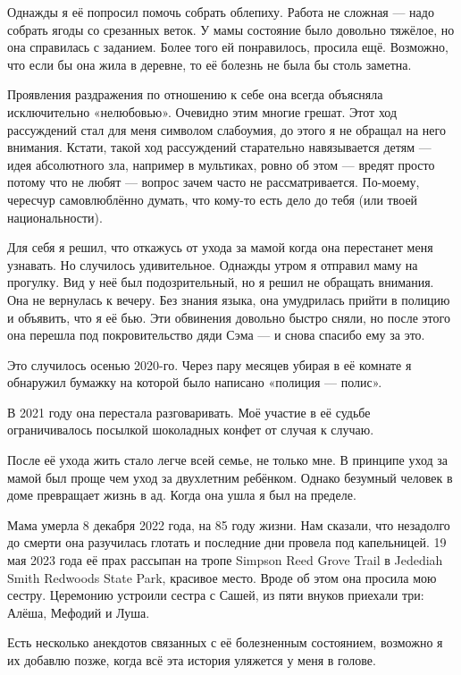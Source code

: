 Однажды я её попросил помочь собрать облепиху.
Работа не сложная --- надо собрать ягоды со срезанных веток.
У мамы состояние было довольно тяжёлое, но она справилась с заданием. 
Более того ей понравилось, просила ещё.
Возможно, что если бы она жила в деревне, то её болезнь не была бы столь заметна.

Проявления раздражения по отношению к себе она всегда объясняла исключительно «нелюбовью».
Очевидно этим многие грешат.
Этот ход рассуждений стал для меня символом слабоумия, до этого я не обращал на него внимания.
Кстати, такой ход рассуждений старательно навязывается детям --- идея абсолютного зла, например в мультиках, ровно об этом --- вредят просто потому что не любят --- вопрос зачем часто не рассматривается.
По-моему, чересчур самовлюблённо думать, что кому-то есть дело до тебя (или твоей национальности). 

Для себя я решил, что откажусь от ухода за мамой когда она перестанет меня узнавать.
Но случилось удивительное.
Однажды утром я отправил маму на прогулку.
Вид у неё был подозрительный, но я решил не обращать внимания.
Она не вернулась к вечеру.
Без знания языка, она умудрилась прийти в полицию и объявить, что я её бью.
Эти обвинения довольно быстро сняли, но после этого она перешла под покровительство дяди Сэма --- и снова спасибо ему за это.

Это случилось осенью 2020-го.
Через пару месяцев убирая в её комнате я обнаружил бумажку на которой было написано «полиция --- полис».

В 2021 году она перестала разговаривать.
Моё участие в её судьбе ограничивалось посылкой шоколадных конфет от случая к случаю.

После её ухода жить стало легче всей семье, не только мне.
В принципе уход за мамой был проще чем уход за двухлетним ребёнком.
Однако безумный человек в доме превращает жизнь в ад.
Когда она ушла я был на пределе.

Мама умерла 8 декабря 2022 года, на 85 году жизни.
Нам сказали, что незадолго до смерти она разучилась глотать и последние дни провела под капельницей.
19 мая 2023 года её прах рассыпан на тропе Simpson Reed Grove Trail в Jedediah Smith Redwoods State Park,
красивое место.
Вроде об этом она просила мою сестру.
Церемонию устроили сестра с Сашей, из пяти внуков приехали три: Алёша, Мефодий и Луша.

Есть несколько анекдотов связанных с её болезненным состоянием, возможно я их добавлю позже, когда всё эта история уляжется у меня в голове.
